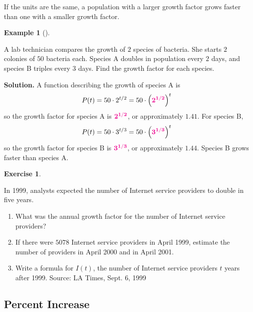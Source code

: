 \documentclass[10pt,]{book}
\theoremstyle{plain}
\theoremstyle{definition}
\theoremstyle{definition}
\theoremstyle{definition}
\newtheorem{example}[theorem]{Example}
\theoremstyle{definition}
\theoremstyle{definition}
\newtheorem{exercise}[theorem]{Exercise}
\numberwithin{equation}{section}
\newcommand{\alert}[1]{\mathbf{\color{magenta}{#1}}}
\begin{document}
    If the units are the same, a population with a larger growth factor grows faster than one with a smaller growth factor.
%
\begin{example}[]\label{example-compare-growth-factors}

    A lab technician compares the growth of \(2\) species of bacteria. She starts \(2\) colonies of \(50\) bacteria each. Species A doubles in population every \(2\) days, and species B triples every \(3\) days. Find the growth factor for each species.
%
\par\medskip\noindent%
\textbf{Solution.}\quad 
    A function describing the growth of species A is
    \begin{equation*}P(t) = 50 \cdot 2^{t/2} = 50 \cdot \left(\alert{2^{1/2}}\right)^t\end{equation*}
    so the growth factor for species A is \(\alert{2^{1/2}}\), or approximately \(1.41\). For species B,
    \begin{equation*}P(t) = 50 \cdot 3^{t/3} = 50 \cdot \left(\alert{3^{1/3}}\right)^t\end{equation*}
     so the growth factor for species B is \(\alert{3^{1/3}}\), or approximately \(1.44\). Species B grows faster than species A.
%
\end{example}
\begin{exercise}\label{exerise-internet-providers}

    In 1999, analysts expected the number of Internet service providers to double in five years.
    \leavevmode%
\begin{enumerate}[label=*\alph**]
\item\hypertarget{li-612}{}What was the annual growth factor for the number of Internet service providers?\item\hypertarget{li-613}{}If there were \(5078\) Internet service providers in April 1999, estimate the number of providers in April 2000 and in April 2001.\item\hypertarget{li-614}{}Write a formula for \(I (t)\), the number of Internet service providers \(t\) years after 1999.
        Source: LA Times, Sept. 6, 1999%
\end{enumerate}

%
\end{exercise}
\typeout{************************************************}
\typeout{************************************************}
\subsection[Percent Increase]{Percent Increase}\label{subsection-87}
\end{document}
